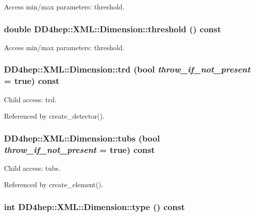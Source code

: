 Access min/max parameters: threshold. \hypertarget{struct_d_d4hep_1_1_x_m_l_1_1_dimension_a4a421edac03d2532f8970f335b5d2b6c}{
\subsubsection[{threshold}]{\setlength{\rightskip}{0pt plus 5cm}double DD4hep::XML::Dimension::threshold () const}}
\label{struct_d_d4hep_1_1_x_m_l_1_1_dimension_a4a421edac03d2532f8970f335b5d2b6c}


Access min/max parameters: threshold. \hypertarget{struct_d_d4hep_1_1_x_m_l_1_1_dimension_a46766eff05cc8175394310649789f514}{
\subsubsection[{trd}]{ DD4hep::XML::Dimension::trd (bool {\em throw\_\-if\_\-not\_\-present} = {\ttfamily true}) const}}
\label{struct_d_d4hep_1_1_x_m_l_1_1_dimension_a46766eff05cc8175394310649789f514}


Child access: trd. 

Referenced by create\_\-detector().\hypertarget{struct_d_d4hep_1_1_x_m_l_1_1_dimension_a07f4362642a3df08007d05465265af1c}{
\subsubsection[{tubs}]{ DD4hep::XML::Dimension::tubs (bool {\em throw\_\-if\_\-not\_\-present} = {\ttfamily true}) const}}
\label{struct_d_d4hep_1_1_x_m_l_1_1_dimension_a07f4362642a3df08007d05465265af1c}


Child access: tubs. 

Referenced by create\_\-element().\hypertarget{struct_d_d4hep_1_1_x_m_l_1_1_dimension_abb81bc1821e8003982eea5b136f70788}{
\subsubsection[{type}]{\setlength{\rightskip}{0pt plus 5cm}int DD4hep::XML::Dimension::type () const}}
\label{struct_d_d4hep_1_1_x_m_l_1_1_dimension_abb81bc1821e8003982eea5b136f70788}


